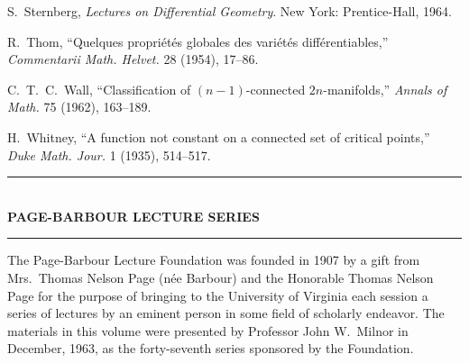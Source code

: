 

\noindent [35] S.~Sternberg, \emph{Lectures on Differential Geometry}. New York: Prentice-Hall, 1964.

\noindent [36] R.~Thom, ``Quelques propri\'et\'es globales des vari\'et\'es diff\'erentiables,'' \emph{Commentarii Math. Helvet.} 28 (1954), 17--86.

\noindent [37] C.~T.~C.~Wall, ``Classification of $(n - 1)$-connected $2n$-manifolds,'' \emph{Annals of Math.} 75 (1962), 163--189.

\noindent [38] H.~Whitney, ``A function not constant on a connected set of critical points,'' \emph{Duke Math. Jour.} 1 (1935), 514--517.



\begin{center}
\rule{0.8\textwidth}{0.4pt}\\[0.6em]
{\large\bfseries PAGE-BARBOUR LECTURE SERIES}\\[0.6em]
\rule{0.8\textwidth}{0.4pt}
\end{center}

The Page-Barbour Lecture Foundation was founded in 1907 by a gift from Mrs.~Thomas Nelson Page (n\'ee Barbour) and the Honorable Thomas Nelson Page for the purpose of bringing to the University of Virginia each session a series of lectures by an eminent person in some field of scholarly endeavor. The materials in this volume were presented by Professor John W.~Milnor in December, 1963, as the forty-seventh series sponsored by the Foundation.



